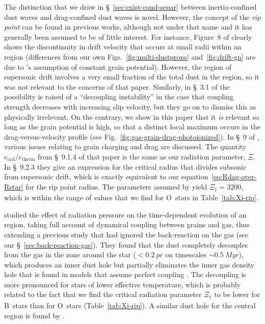 The distinction that we draw in \S~\ref{sec:exist-cond-separ} between
inertia-confined dust waves and drag-confined dust waves is novel.
However, the concept of the \textit{rip point} can be found in
previous works, although not under that name and it has generally been
assumed to be of little interest.  For instance, Figure~8 of
\citet{Draine:2011a} clearly shows the discontinuity in drift velocity
that occurs at small radii within an \hii{} region (differences from
our own Figs.~\ref{fig:multi-dustprops} and~\ref{fig:drift-gn} are due
to \citeauthor{Draine:2011a}'s assumption of constant grain
potential).  However, the region of supersonic drift involves a very
small fraction of the total dust in the \hii{} region, so it was not
relevant to the concerns of that paper. Similarly, in \S~3.1 of
\citet{Hopkins:2018c} the possibility is raised of a ``decoupling
instability'' in the case that coupling strength decreases with
increasing slip velocity, but they go on to dismiss this as physically
irrelevant.  On the contrary, we show in this paper that it \emph{is}
relevant so long as the grain potential is high, so that a distinct
local maximum occurs in the drag-versus-velocity profile (see
Fig.~\ref{fig:gas-grain-drag-photoionized}).  In \S~9 of
\citet{Hopkins:2018a}, various issues relating to grain charging and
drag are discussed.  The quantity
\(e_{\text{rad}} / e_{\text{therm}}\) from \S~9.1.4 of that paper is
the same as our radiation parameter, \(\Xi\).  In \S~9.2.3 they give an
expression for the critical radius that divides subsonic from
supersonic drift, which is exactly equivalent to our
equation~\eqref{eq:Rdag-over-Rstar} for the rip point radius.  The
parameters assumed by \citeauthor{Hopkins:2018a} yield
\(\Xi_\dag = 3200\), which is within the range of values that we find for
O~stars in Table~\ref{tab:Xi-rip}.

\citet{Akimkin:2017a} studied the effect of radiation pressure on the
time-dependent evolution of an \hii{} region, taking full account of
dynamical coupling between grains and gas, thus extending a previous
study \citep{Akimkin:2015a} that had ignored the back-reaction on the
gas (see our \S~\ref{sec:back-reaction-gas}).  They found that the
dust completely decouples from the gas in the zone around the star
(\(< \SI{0.2}{pc}\) on timescales \(\sim \SI{0.5}{Myr}\)), which produces
an inner dust hole but partially eliminates the inner gas density hole
that is found in models that assume perfect coupling
\citep{Mathews:1967a, Draine:2011a, Kim:2016b}. The decoupling is more
pronounced for stars of lower effective temperature, which is probably
related to the fact that we find the critical radiation parameter
\(\Xi_\dag\) to be lower for B~stars than for O~stars
(Table~\ref{tab:Xi-rip}).  A similar dust hole for the central region
is found by \citet{Ishiki:2018a}.

